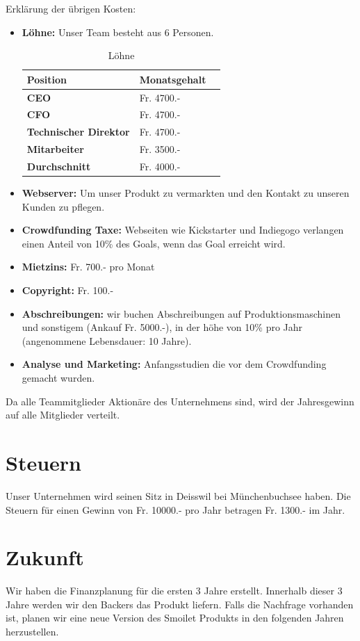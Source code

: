 Erkl\"arung der \"ubrigen Kosten:\\
\begin{itemize}
\item \textbf{L\"ohne:} Unser Team besteht aus 6 Personen. \\
\begin{table}[H]
\centering
\caption{L\"ohne}
\label{L\"ohne}
\begin{tabular}{lll}
\textbf{Position} & \textbf{Monatsgehalt}  \\ \hline
  \textbf{CEO} &  Fr. 4700.- \\ \hline
 \textbf{CFO} &  Fr. 4700.- \\ \hline
 \textbf{Technischer Direktor}& Fr. 4700.-  \\ \hline
 \textbf{Mitarbeiter} &Fr.  3500.- \\ \hline
 \textbf{Durchschnitt} & Fr. 4000.-\\ \hline
\end{tabular}
\end{table}
\item \textbf{Webserver:} Um unser Produkt zu vermarkten und den Kontakt zu unseren Kunden zu pflegen.

\item \textbf{Crowdfunding Taxe:} Webseiten wie Kickstarter und Indiegogo verlangen einen Anteil von 10\% des Goals, wenn das Goal erreicht wird.
\item \textbf{Mietzins:} Fr. 700.- pro Monat
\item \textbf{Copyright:} Fr. 100.-
\item \textbf{Abschreibungen:} wir buchen Abschreibungen auf Produktionsmaschinen und sonstigem (Ankauf Fr. 5000.-), in der h\"ohe von 10\% pro Jahr (angenommene Lebensdauer: 10 Jahre).
\item \textbf{Analyse und Marketing:} Anfangsstudien die vor dem Crowdfunding gemacht wurden.
\end{itemize}
Da alle Teammitglieder Aktion\"are des Unternehmens sind, wird der Jahresgewinn auf alle Mitglieder verteilt.
\section{Steuern}
Unser Unternehmen wird seinen Sitz in Deisswil bei M\"unchenbuchsee haben. Die Steuern f\"ur einen Gewinn von Fr. 10000.- pro Jahr betragen Fr. 1300.- im Jahr.
\section{Zukunft}
Wir haben die Finanzplanung f\"ur die ersten 3 Jahre erstellt. Innerhalb dieser 3 Jahre werden wir den Backers das Produkt liefern. Falls die Nachfrage vorhanden ist, planen wir eine neue Version des Smoilet Produkts in den folgenden Jahren herzustellen. 
